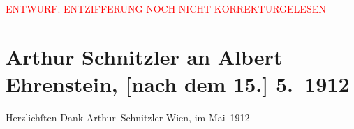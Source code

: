 
\begin{center}
            \textcolor{red}{ENTWURF. ENTZIFFERUNG NOCH NICHT KORREKTURGELESEN}
                      \end{center}
            
               \section[Arthur Schnitzler an Albert Ehrenstein, {[}nach dem 15.{]} 5. 1912]{ Arthur Schnitzler an Albert Ehrenstein, {[}nach dem 15.{]}
                    5. 1912}\nopagebreak{}\rehead{ }\begin{ledgroupsized}[t]{13cm}\normalsize\beginnumbering{} \toendnotes[C]{\smallbreak\pagebreak[2]} 
\pstart
           \noindent{}{\pb}Herzlichſten Dank\pend
           \pstart \spacefill\mbox{Arthur Schnitzler}\pend{}\pstart
           \raggedleft{}Wien, im Mai 1912\pend
           \endnumbering{}\end{ledgroupsized}  \newcommand{\dateiname}{L02068}\newcommand{\titel}{Arthur Schnitzler an Albert Ehrenstein, [nach dem 15.] 5. 1912}\newcommand{\editorInnen}{Martin Anton Müller und Gerd-Hermann Susen}
      